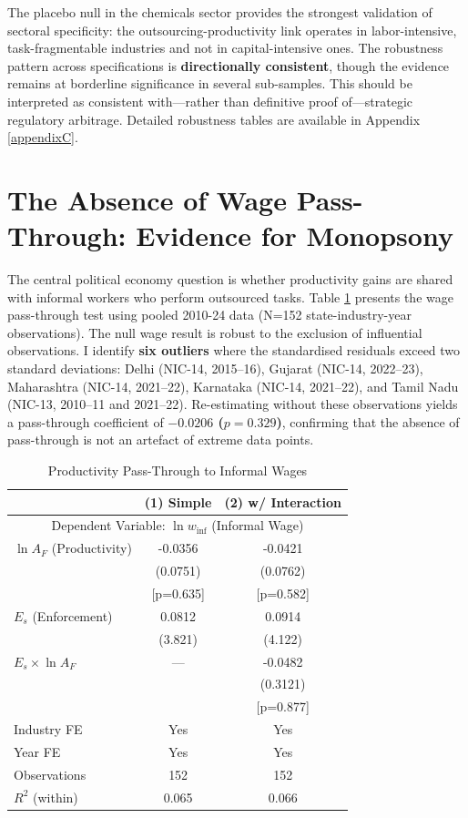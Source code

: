 The placebo null in the chemicals sector provides the strongest validation of sectoral specificity: the outsourcing-productivity link operates in labor-intensive, task-fragmentable industries and not in capital-intensive ones. The robustness pattern across specifications is \textbf{directionally consistent}, though the evidence remains at borderline significance in several sub-samples. This should be interpreted as consistent with—rather than definitive proof of—strategic regulatory arbitrage. Detailed robustness tables are available in Appendix \ref{appendixC}.

\section{The Absence of Wage Pass-Through: Evidence for Monopsony}
\label{sec:wage_results}

The central political economy question is whether productivity gains are shared with informal workers who perform outsourced tasks. Table \ref{tab:wage_pass_through} presents the wage pass-through test using pooled 2010-24 data (N=152 state-industry-year observations).
The null wage result is robust to the exclusion of influential observations. I identify \textbf{six outliers} where the standardised residuals exceed two standard deviations: Delhi (NIC-14, 2015--16), Gujarat (NIC-14, 2022--23), Maharashtra (NIC-14, 2021--22), Karnataka (NIC-14, 2021--22), and Tamil Nadu (NIC-13, 2010--11 and 2021--22). Re-estimating without these observations yields a pass-through coefficient of \textbf{$-0.0206$ ($p = 0.329$)}, confirming that the absence of pass-through is not an artefact of extreme data points.

\begin{table}[H]
	\centering
	\caption{Productivity Pass-Through to Informal Wages}
	\label{tab:wage_pass_through}
	\begin{tabular}{lcc}
		\toprule
		& (1) Simple & (2) w/ Interaction \\
		\midrule
		\multicolumn{3}{c}{Dependent Variable: $\ln w_{\text{inf}}$ (Informal Wage)} \\
		\midrule
		$\ln A_{F}$ (Productivity) & -0.0356 & -0.0421 \\
		& (0.0751) & (0.0762) \\
		& [p=0.635] & [p=0.582] \\
		$E_s$ (Enforcement) & 0.0812 & 0.0914 \\
		& (3.821) & (4.122) \\
		$E_s \times \ln A_{F}$ & — & -0.0482 \\
		& & (0.3121) \\
		& & [p=0.877] \\
		\midrule
		Industry FE & Yes & Yes \\
		Year FE & Yes & Yes \\
		Observations & 152 & 152 \\
		$R^2$ (within) & 0.065 & 0.066 \\
		\bottomrule
	\end{tabular}
\end{table}

